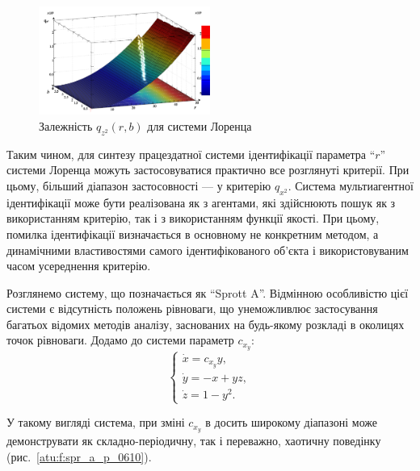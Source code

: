 \documentclass[a4paper,13pt]{atuaref}
\begin{document}
\begin{figure}[ht!]
  \centerline{  \includegraphics[width=0.50\textwidth]{p5/p/cha/lor/q2d/lor_qz2_r_b.png}  }
  \caption{Залежність $q_{z^2}(r,b)$ для системи Лоренца}
  \label{atu:f:lor_qz2_r_b}
\end{figure}


Таким чином,
для синтезу працездатної системи ідентифікації параметра ``$r$'' системи
Лоренца можуть застосовуватися практично все розглянуті критерії. При цьому,
більший діапазон застосовності --- у критерію  $q_{x^2}$.
Система мультиагентної ідентифікації може бути реалізована як з агентами, які
здійснюють пошук як з використанням критерію, так і з використанням функції
якості. При цьому, помилка ідентифікації визначається в основному не конкретним
методом, а динамічними властивостями самого ідентифікованого об'єкта і
використовуваним часом усереднення критерію.


Розглянемо систему, що позначається як ``Sprott A''. Відмінною
особливістю цієї системи є відсутність положень рівноваги, що унеможливлює
застосування багатьох відомих методів аналізу, заснованих на будь-якому
розкладі в околицях точок рівноваги.
Додамо до системи параметр $c_{x_y}$:
%
%
\begin{equation}
  \begin{cases}
    \dot{x} =  c_{x_y} y, \\
    \dot{y} = -x + yz, \\
    \dot{z} =  1 - y^2.
  \end{cases}
  \label{atu:eq:spr_a}
\end{equation}

У такому вигляді система, при зміні $c_{x_y} $ в досить широкому діапазоні
може демонструвати як складно-періодичну, так і переважно, хаотичну поведінку
(рис.~\ref{atu:f:spr_a_p_0610}).
\end{document}
